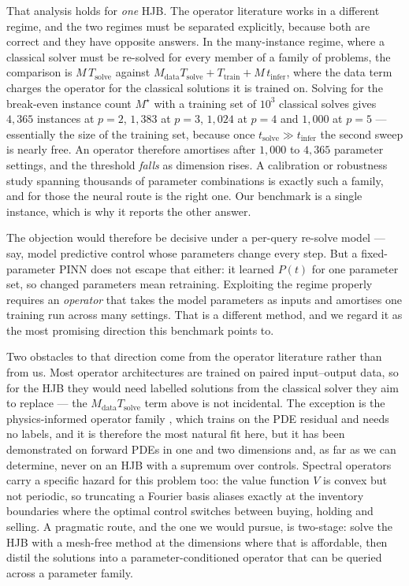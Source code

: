 \documentclass[conference]{IEEEtran}
\begin{document}
That analysis holds for \emph{one} HJB. The operator literature works in a different regime, and
the two regimes must be separated explicitly, because both are correct and they have opposite
answers. In the many-instance regime, where a classical solver must be re-solved for every member
of a family of problems, the comparison is
$M\,T_{\text{solve}}$ against $M_{\text{data}}T_{\text{solve}} + T_{\text{train}} + M\,t_{\text{infer}}$,
where the data term charges the operator for the classical solutions it is trained on. Solving for
the break-even instance count $M^\star$ with a training set of $10^3$ classical solves gives
$4{,}365$ instances at $p=2$, $1{,}383$ at $p=3$, $1{,}024$ at $p=4$ and $1{,}000$ at $p=5$ ---
essentially the size of the training set, because once $t_{\text{solve}} \gg t_{\text{infer}}$ the
second sweep is nearly free. An operator therefore amortises after $1{,}000$ to $4{,}365$ parameter settings,
and the threshold \emph{falls} as dimension rises. A calibration or robustness study spanning
thousands of parameter combinations is exactly such a family, and for those the neural route is
the right one. Our benchmark is a single instance, which is why it reports the other answer.

The objection would therefore be decisive under a per-query re-solve model --- say, model
predictive control whose parameters change every step. But a fixed-parameter PINN does not escape
that either: it learned $P(t)$ for one parameter set, so changed parameters mean retraining.
Exploiting the regime properly requires an \emph{operator} that takes the model parameters as
inputs and amortises one training run across many settings. That is a different method,
and we regard it as the most promising direction this benchmark points to.

Two obstacles to that direction come from the operator literature rather than from us. Most
operator architectures are trained on paired input--output data, so for
the HJB they would need labelled solutions from the classical solver they aim to replace --- the
$M_{\text{data}}T_{\text{solve}}$ term above is not incidental. The exception is the
physics-informed operator family \cite{wang2021physics}, which trains on the PDE residual and
needs no labels, and it is therefore the most natural fit here, but it has been demonstrated on
forward PDEs in one and two dimensions and, as far as we can determine, never on an HJB with a
supremum over controls. Spectral operators carry a specific hazard for this problem too: the
value function $V$ is convex but not periodic, so truncating a Fourier basis aliases exactly at
the inventory boundaries where the optimal control switches between buying, holding and selling.
A pragmatic route, and the one we would pursue, is two-stage: solve the HJB with a mesh-free
method at the dimensions where that is affordable, then distil the solutions into a
parameter-conditioned operator that can be queried across a parameter family.
\end{document}
